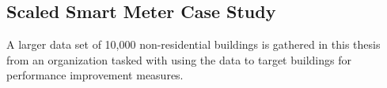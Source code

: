 \subsection{Scaled Smart Meter Case Study}
\label{sec:smartmeterdata}

A larger data set of 10,000 non-residential buildings is gathered in this thesis from an organization tasked with using the data to target buildings for performance improvement measures.